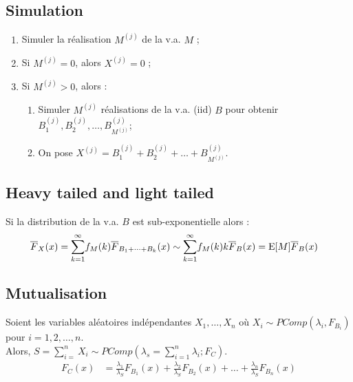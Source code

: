 \documentclass[10pt, french]{article}
\begin{document}
\begin{multicols*}{2}
\subsection{Simulation}
\begin{algo2}
\begin{enumerate}
	\item	Simuler la réalisation $M^{(j)}$ de la v.a. $M$ ;
	\item	Si $M^{(j)}	=	0$, alors $X^{(j)}	=	0$ ;
	\item	Si $M^{(j)}	>	0$, alors :	
		\begin{enumerate}
		\item	Simuler $M^{(j)}$ réalisations de la v.a. (iid) $B$ pour obtenir $B^{(j)}_{1}, B^{(j)}_{2}, \dots, B^{(j)}_{M^{(j)}}$;
		\item	On pose $X^{(j)}	=	B^{(j)}_{1} + B^{(j)}_{2} + \dots + B^{(j)}_{M^{(j)}}$.
		\end{enumerate}
\end{enumerate}
\end{algo2}

\subsection{Heavy tailed and light tailed}
Si la distribution de la v.a. $B$ est sub-exponentielle alors :
\begin{align*}
	\overline{F}_{X}(x)
	&=	\overset{\infty}{\underset{k	=	1}{\sum}}f_{M}(k) \overline{F}_{B_{1} + \dots + B_{k}}(x)
	\sim	\overset{\infty}{\underset{k	=	1}{\sum}}f_{M}(k)k\overline{F}_{B}(x)
	=	\text{E}[M]\overline{F}_{B}(x)
\end{align*}

\subsection{Mutualisation}

\begin{definitionNOHFILLsub}
Soient les variables aléatoires indépendantes $X_{1}, \dots, X_{n}$ où $X_{i} \sim PComp(\lambda_{i}, F_{B_{i}})$ pour $i	=	1, 2, \dots, n$.\\
Alors, $S	=	\sum_{i = }^{n} X_{i}	\sim	PComp(\lambda_{s} = \sum_{i = 1}^{n}\lambda_{i}; F_{C})$.
\begin{align*}
	F_{C}(x)
	&=	\frac{\lambda_{1}}{\lambda_{S}}F_{B_{1}}(x) + \frac{\lambda_{2}}{\lambda_{S}}F_{B_{2}}(x) + \dots + \frac{\lambda_{n}}{\lambda_{S}}F_{B_{n}}(x)	\\
\end{align*}
\end{definitionNOHFILLsub}


\end{multicols*}
\end{document}
